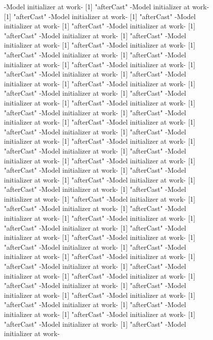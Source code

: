 \documentclass[a4paper]{article}
\begin{document}
\begin{figure}
  \centering
\begin{Schunk}
\begin{Soutput}
-Model initializer at work-
[1] "afterCast"
-Model initializer at work-
[1] "afterCast"
-Model initializer at work-
[1] "afterCast"
-Model initializer at work-
[1] "afterCast"
-Model initializer at work-
[1] "afterCast"
-Model initializer at work-
[1] "afterCast"
-Model initializer at work-
[1] "afterCast"
-Model initializer at work-
[1] "afterCast"
-Model initializer at work-
[1] "afterCast"
-Model initializer at work-
[1] "afterCast"
-Model initializer at work-
[1] "afterCast"
-Model initializer at work-
[1] "afterCast"
-Model initializer at work-
[1] "afterCast"
-Model initializer at work-
[1] "afterCast"
-Model initializer at work-
[1] "afterCast"
-Model initializer at work-
[1] "afterCast"
-Model initializer at work-
[1] "afterCast"
-Model initializer at work-
[1] "afterCast"
-Model initializer at work-
[1] "afterCast"
-Model initializer at work-
[1] "afterCast"
-Model initializer at work-
[1] "afterCast"
-Model initializer at work-
[1] "afterCast"
-Model initializer at work-
[1] "afterCast"
-Model initializer at work-
[1] "afterCast"
-Model initializer at work-
[1] "afterCast"
-Model initializer at work-
[1] "afterCast"
-Model initializer at work-
[1] "afterCast"
-Model initializer at work-
[1] "afterCast"
-Model initializer at work-
[1] "afterCast"
-Model initializer at work-
[1] "afterCast"
-Model initializer at work-
[1] "afterCast"
-Model initializer at work-
[1] "afterCast"
-Model initializer at work-
[1] "afterCast"
-Model initializer at work-
[1] "afterCast"
-Model initializer at work-
[1] "afterCast"
-Model initializer at work-
[1] "afterCast"
-Model initializer at work-
[1] "afterCast"
-Model initializer at work-
[1] "afterCast"
-Model initializer at work-
[1] "afterCast"
-Model initializer at work-
[1] "afterCast"
-Model initializer at work-
[1] "afterCast"
-Model initializer at work-
[1] "afterCast"
-Model initializer at work-
[1] "afterCast"
-Model initializer at work-
[1] "afterCast"
-Model initializer at work-
[1] "afterCast"
-Model initializer at work-
[1] "afterCast"
-Model initializer at work-
[1] "afterCast"
-Model initializer at work-
[1] "afterCast"
-Model initializer at work-
[1] "afterCast"
-Model initializer at work-
[1] "afterCast"
-Model initializer at work-
[1] "afterCast"
-Model initializer at work-

\end{Soutput}
\end{Schunk}
\end{figure}
\end{document}
